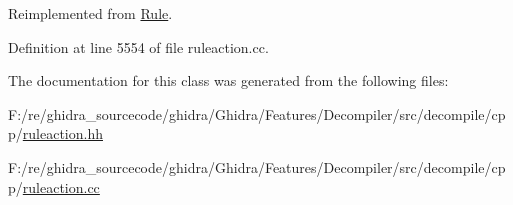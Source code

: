 Reimplemented from \mbox{\hyperlink{class_rule_a4023bfc7825de0ab866790551856d10e}{Rule}}.



Definition at line 5554 of file ruleaction.\+cc.



The documentation for this class was generated from the following files\+:\begin{DoxyCompactItemize}
\item 
F\+:/re/ghidra\+\_\+sourcecode/ghidra/\+Ghidra/\+Features/\+Decompiler/src/decompile/cpp/\mbox{\hyperlink{ruleaction_8hh}{ruleaction.\+hh}}\item 
F\+:/re/ghidra\+\_\+sourcecode/ghidra/\+Ghidra/\+Features/\+Decompiler/src/decompile/cpp/\mbox{\hyperlink{ruleaction_8cc}{ruleaction.\+cc}}\end{DoxyCompactItemize}
